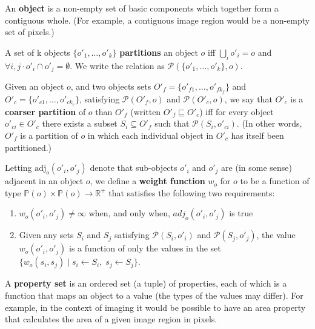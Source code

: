 \begin{definition}
An \textbf{object} is a non-empty set of basic components which together form a contiguous whole. (For example, a contiguous image region would be a non-empty set of pixels.)
\end{definition}

\begin{definition}
A set of k objects $\{o'_1,\ldots,o'_k\}$ \textbf{partitions} an object $o$ iff $\bigcup_i o'_i = o$ and $\forall i,j \cdot o'_i \cap o'_j = \emptyset$. We write the relation as $\mathcal{P}(\{o'_1,\ldots,o'_k\}, o)$.
\end{definition}

\begin{definition}
Given an object $o$, and two objects sets $O'_f = \{o'_{f1},\ldots,o'_{fk_f}\}$ and $O'_c = \{o'_{c1},\ldots,o'_{ck_c}\}$, satisfying $\mathcal{P}(O'_f,o)$ and $\mathcal{P}(O'_c,o)$, we say that $O'_c$ is a \textbf{coarser partition} of $o$ than $O'_f$ (written $O'_f \sqsubseteq O'_c$) iff for every object $o'_{ci} \in O'_c$ there exists a subset $S_i \subseteq O'_f$ such that $\mathcal{P}(S_i,o'_{ci})$. (In other words, $O'_f$ is a partition of $o$ in which each individual object in $O'_c$ has itself been partitioned.)
\end{definition}

\begin{definition}
Letting $\mbox{adj}_o(o'_i, o'_j)$ denote that sub-objects $o'_i$ and $o'_j$ are (in some sense) adjacent in an object $o$, we define a \textbf{weight function} $w_o$ for $o$ to be a function of type $\mathbb{P}(o) \times \mathbb{P}(o) \to \mathbb{R}^+$ that satisfies the following two requirements:

\begin{enumerate}

\item $w_o(o'_i, o'_j) \ne \infty$ when, and only when, $adj_o(o'_i, o'_j)$ is true

\item Given any sets $S_i$ and $S_j$ satisfying $\mathcal{P}(S_i,o'_i)$ and $\mathcal{P}(S_j,o'_j)$, the value $w_o(o'_i, o'_j)$ is a function of only the values in the set $\{w_o(s_i, s_j) \; | \; s_i \leftarrow S_i, \; s_j \leftarrow S_j\}$.

\end{enumerate}

\end{definition}

\begin{definition}
A \textbf{property set} is an ordered set (a tuple) of properties, each of which is a function that maps an object to a value (the types of the values may differ). For example, in the context of imaging it would be possible to have an area property that calculates the area of a given image region in pixels.
\end{definition}

